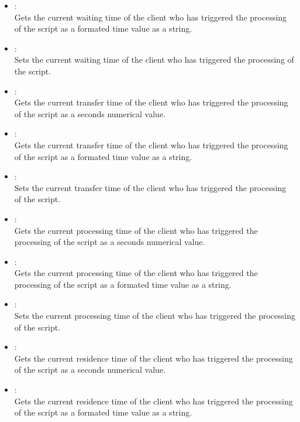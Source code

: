 \begin{itemize}
\item
{}:\\
Gets the current waiting time of the client who has triggered the processing of the script as a formated time value as a string.
    
\item
{}:\\
Sets the current waiting time of the client who has triggered the processing of the script.
  
\item
{}:\\
Gets the current transfer time of the client who has triggered the processing of the script as a seconds numerical value.
  
\item
{}:\\
Gets the current transfer time of the client who has triggered the processing of the script as a formated time value as a string.
  
\item
{}:\\
Sets the current transfer time of the client who has triggered the processing of the script.
  
\item
{}:\\
Gets the current processing time of the client who has triggered the processing of the script as a seconds numerical value.
  
\item
{}:\\
Gets the current processing time of the client who has triggered the processing of the script as a formated time value as a string.
  
\item
{}:\\
Sets the current processing time of the client who has triggered the processing of the script.
  
\item
{}:\\
Gets the current residence time of the client who has triggered the processing of the script as a seconds numerical value.

\item
{}:\\
Gets the current residence time of the client who has triggered the processing of the script as a formated time value as a string.


\end{itemize}
